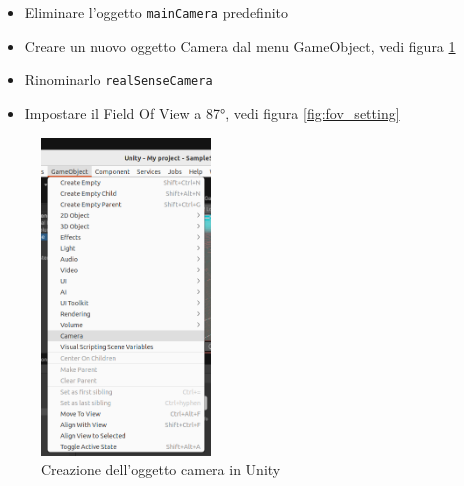 \documentclass[11pt]{report}
\begin{document}
\begin{itemize}
\item Eliminare l'oggetto \texttt{mainCamera} predefinito
\item Creare un nuovo oggetto Camera dal menu GameObject, vedi figura \ref{fig:create_camera}
\item Rinominarlo \texttt{realSenseCamera}
\item Impostare il Field Of View a 87°, vedi figura \ref{fig:fov_setting}
\end{itemize}

\begin{figure}[H]
    \centering
    \includegraphics[width=0.4\textwidth]{images/Immagine1.png}
    \caption{Creazione dell'oggetto camera in Unity}
    \label{fig:create_camera}
\end{figure}
\end{document}
